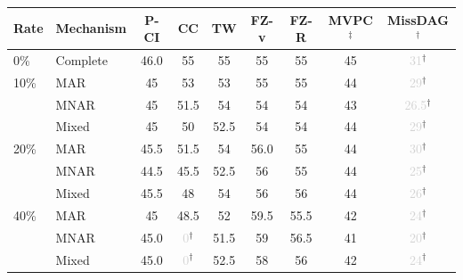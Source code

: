 \begin{tabular}{llccccccc}
    \toprule
    Rate & Mechanism & P-CI & CC & TW & FZ-v & FZ-R & MVPC$^\ddagger$ & MissDAG$^\dagger$ \\
    \midrule
    0\% & Complete & 46.0 & 55 & 55 & 55 & 55 & 45 & \textcolor{lightgray}{31}$^\dagger$ \\
    \midrule
    10\% & MAR   & 45 & 53 & 53 & 55 & 55 & 44 & \textcolor{lightgray}{29}$^\dagger$ \\
         & MNAR  & 45 & 51.5 & 54 & 54 & 54 & 43 & \textcolor{lightgray}{26.5}$^\dagger$ \\
         & Mixed & 45 & 50 & 52.5 & 54 & 54 & 44 & \textcolor{lightgray}{29}$^\dagger$ \\
    \midrule
    20\% & MAR   & 45.5 & 51.5 & 54 & 56.0 & 55 & 44 & \textcolor{lightgray}{30}$^\dagger$ \\
         & MNAR  & 44.5 & 45.5 & 52.5 & 56 & 55 & 44 & \textcolor{lightgray}{25}$^\dagger$ \\
         & Mixed & 45.5 & 48 & 54 & 56 & 56 & 44 & \textcolor{lightgray}{26}$^\dagger$ \\
    \midrule
    40\% & MAR   & 45 & 48.5 & 52 & 59.5 & 55.5 & 42 & \textcolor{lightgray}{24}$^\dagger$ \\
         & MNAR  & 45.0 & \textcolor{lightgray}{0}$^\dagger$ & 51.5 & 59 & 56.5 & 41 & \textcolor{lightgray}{20}$^\dagger$ \\
         & Mixed & 45.0 & \textcolor{lightgray}{0}$^\dagger$ & 52.5 & 58 & 56 & 42 & \textcolor{lightgray}{24}$^\dagger$ \\
    \bottomrule
\end{tabular}
